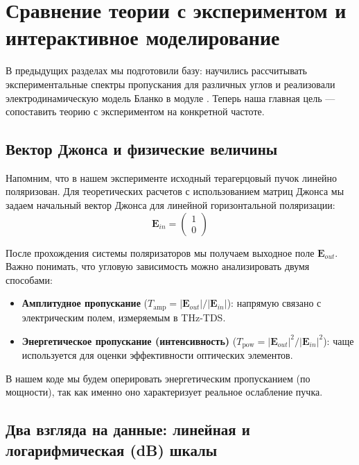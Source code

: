 
\section{Сравнение теории с экспериментом и интерактивное моделирование}

В предыдущих разделах мы подготовили базу: научились рассчитывать экспериментальные спектры пропускания для различных углов и реализовали электродинамическую модель Бланко в модуле . Теперь наша главная цель — сопоставить теорию с экспериментом на конкретной частоте.

\subsection{Вектор Джонса и физические величины}
Напомним, что в нашем эксперименте исходный терагерцовый пучок линейно поляризован. Для теоретических расчетов с использованием матриц Джонса мы задаем начальный вектор Джонса для линейной горизонтальной поляризации:
\begin{equation}
\mathbf{E}_{in} = \begin{pmatrix} 1 \\ 0 \end{pmatrix}
\end{equation}

После прохождения системы поляризаторов мы получаем выходное поле $\mathbf{E}_{out}$. Важно понимать, что угловую зависимость можно анализировать двумя способами:
\begin{itemize}
    \item \textbf{Амплитудное пропускание} ($T_{\text{amp}} = |\mathbf{E}_{out}| / |\mathbf{E}_{in}|$): напрямую связано с электрическим полем, измеряемым в THz-TDS.
    \item \textbf{Энергетическое пропускание (интенсивность)} ($T_{\text{pow}} = |\mathbf{E}_{out}|^2 / |\mathbf{E}_{in}|^2$): чаще используется для оценки эффективности оптических элементов.
\end{itemize}
В нашем коде мы будем оперировать энергетическим пропусканием (по мощности), так как именно оно характеризует реальное ослабление пучка.

\subsection{Два взгляда на данные: линейная и логарифмическая (dB) шкалы}

